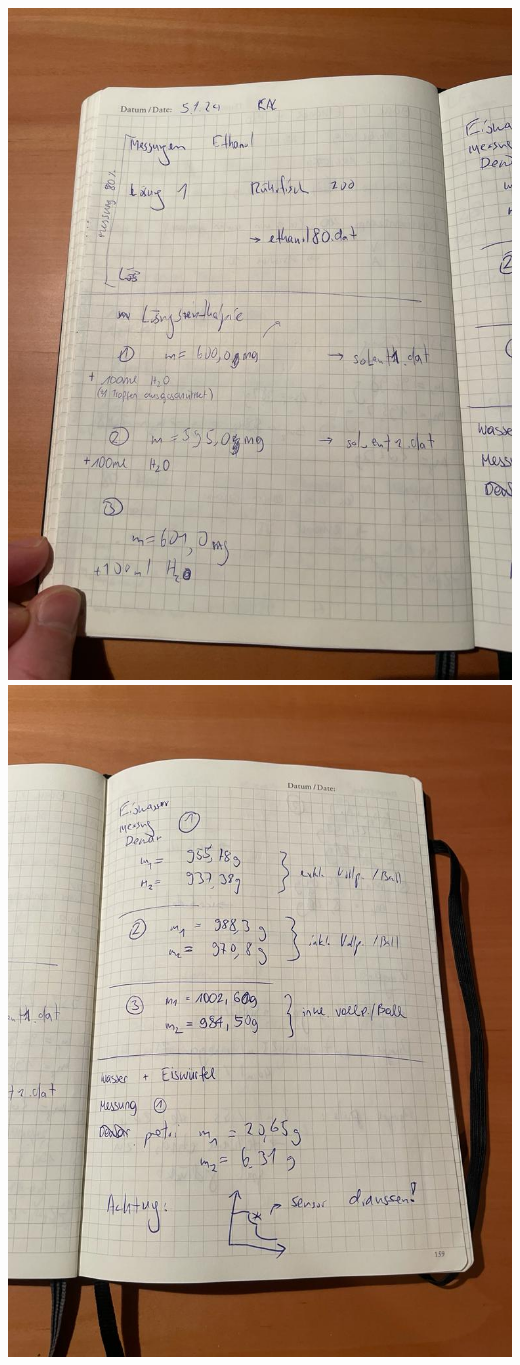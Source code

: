 \includegraphics[scale = 0.2]{figures/photo_3.jpg} 
\includegraphics[scale = 0.2]{figures/photo_4.jpg} 
